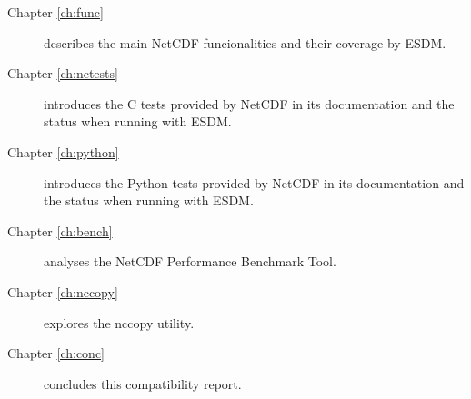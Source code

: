 \begin{description}

\item[Chapter \ref{ch:func}] describes the main NetCDF funcionalities and their coverage by ESDM.

\item[Chapter \ref{ch:nctests}] introduces the C tests provided by NetCDF in its documentation and the status when running with ESDM.

\item[Chapter \ref{ch:python}] introduces the Python tests provided by NetCDF in its documentation and the status when running with ESDM.

\item[Chapter \ref{ch:bench}] analyses the NetCDF Performance Benchmark Tool.

\item[Chapter \ref{ch:nccopy}] explores the nccopy utility.

\item[Chapter \ref{ch:conc}] concludes this compatibility report.

\end{description}

